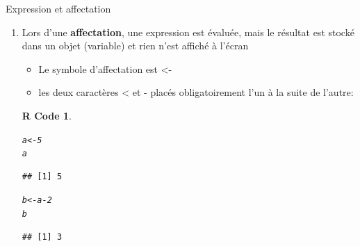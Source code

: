 \documentclass[11pt]{beamer}\usepackage[]{graphicx}\usepackage[]{color}
\makeatletter
\newcommand{\hlnum}[1]{\textcolor[rgb]{0.063,0.58,0.627}{#1}}%
\newcommand{\hlopt}[1]{\textcolor[rgb]{0.196,0.196,0.196}{#1}}%
\newcommand{\hlstd}[1]{\textcolor[rgb]{0.196,0.196,0.196}{#1}}%
\newcommand{\hlkwb}[1]{\textcolor[rgb]{0.627,0,0.314}{#1}}%
\newenvironment{kframe}{%
 \def\at@end@of@kframe{}%
 \ifinner\ifhmode%
  \def\at@end@of@kframe{\end{minipage}}%
  \begin{minipage}{\columnwidth}%
 \fi\fi%
 \def\FrameCommand##1{\hskip\@totalleftmargin \hskip-\fboxsep
 \colorbox{shadecolor}{##1}\hskip-\fboxsep
     \hskip-\linewidth \hskip-\@totalleftmargin \hskip\columnwidth}%
 \MakeFramed {\advance\hsize-\width
   \@totalleftmargin\z@ \linewidth\hsize
   \@setminipage}}%
 {\par\unskip\endMakeFramed%
 \at@end@of@kframe}
\newenvironment{knitrout}{}{} %
\newtheorem{rcode}{R Code}[section]
\newcounter{saveenumi}
\newcommand{\seti}{\setcounter{saveenumi}{\value{enumi}}}
\newcommand{\conti}{\setcounter{enumi}{\value{saveenumi}}}
\makeatother
\begin{document}
\begin{frame}[fragile]{Expression et affectation} 
\begin{enumerate}
\conti
\item Lors d’une \textbf{affectation}, une expression est évaluée, mais le résultat est stocké dans un objet (variable) et rien n’est affiché à l’écran
\begin{itemize}
\item Le symbole d’affectation est <-  
\item les deux caractères < et - placés obligatoirement l'un à la suite de l'autre:
\end{itemize}
\pause
\begin{knitrout}
\color{fgcolor}\begin{kframe}
\begin{rcode}\label{unnamed-chunk-10}\hfill{}\begin{alltt}
\hlstd{a} \hlkwb{<-} \hlnum{5}
\hlstd{a}
\end{alltt}
\begin{verbatim}
## [1] 5
\end{verbatim}
\begin{alltt}
\hlstd{b} \hlkwb{<-} \hlstd{a} \hlopt{-} \hlnum{2}
\hlstd{b}
\end{alltt}
\begin{verbatim}
## [1] 3
\end{verbatim}
\end{rcode}\end{kframe}
\end{knitrout}
\seti
\end{enumerate}

\end{frame}
\end{document}
